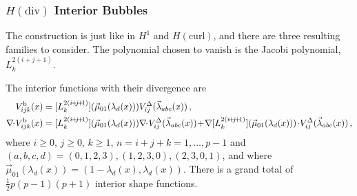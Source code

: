 %

\subsubsection{\texorpdfstring{$H(\mathrm{div})$}{Hdiv} Interior Bubbles}

The construction is just like in $H^1$ and $H(\mathrm{curl})$, and there are three resulting families to consider.
The polynomial chosen to vanish is the Jacobi polynomial, $L_k^{2(i+j+1)}$. 

The interior functions with their divergence are
\begin{equation}
	\begin{aligned}
		V_{ijk}^\mathrm{b}(x)&=[L_k^{2(i\!+\!j\!+\!1)}](\vec{\mu}_{01}(\lambda_d(x)))V_{ij}^\Tri(\vec{\lambda}_{abc}(x))\,,\\
		\nabla\!\!\cdot\! V_{ijk}^\mathrm{b}(x)&=[L_k^{2(i\!+\!j\!+\!1)}](\vec{\mu}_{01}(\lambda_d(x)))
			\nabla\!\!\cdot\! V_{ij}^\Tri(\vec{\lambda}_{abc}(x))
				\!+\!\nabla[L_k^{2(i\!+\!j\!+\!1)}](\vec{\mu}_{01}(\lambda_d(x)))\!\cdot\! V_{ij}^\Tri(\vec{\lambda}_{abc}(x))\,,
	\end{aligned}
\end{equation}
where $i\geq0$, $j\geq0$, $k\geq1$, $n=i+j+k=1,\ldots,p-1$ and $(a,b,c,d)=(0,1,2,3),(1,2,3,0),(2,3,0,1)$, and where $\vec{\mu}_{01}(\lambda_d(x))=(1-\lambda_d(x),\lambda_d(x))$.
There is a grand total of $\frac{1}{2}p(p-1)(p+1)$ interior shape functions.

